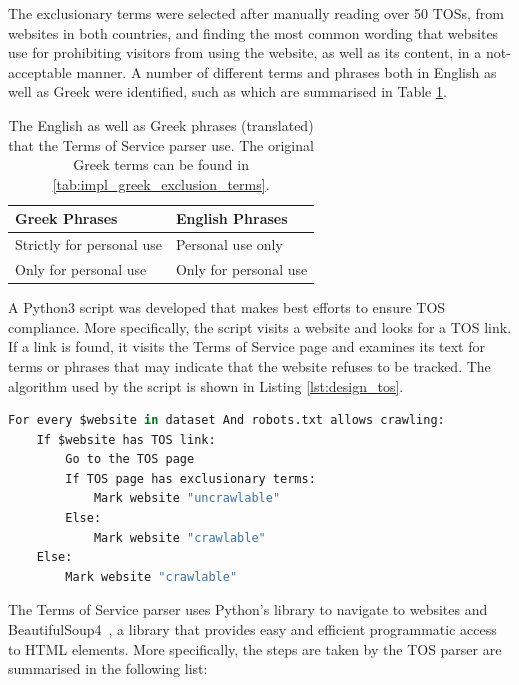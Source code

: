 \documentclass[../main.tex]{subfiles}
\begin{document}
The exclusionary terms were selected after manually reading over 50 TOSs, from websites in both countries, and finding the most common wording that websites use for prohibiting visitors from using the website, as well as its content, in a not-acceptable manner. A number of different terms and phrases both in English as well as Greek were identified, such as  which are summarised in Table \ref{tab:design_tos_terms}.

\begin{table}[ht]
    \centering
    \begin{tabular}{@{}ll@{}}
        \toprule
        \textbf{Greek Phrases}    & \textbf{English Phrases} \\ \midrule
        Strictly for personal use & Personal use only        \\
        Only for personal use     & Only for personal use    \\ \bottomrule
    \end{tabular}
    \caption{The English as well as Greek phrases (translated) that the Terms of Service parser use. The original Greek terms can be found in \ref{tab:impl_greek_exclusion_terms}.}
    \label{tab:design_tos_terms}
\end{table}

\newpage
A Python3 script was developed that makes best efforts to ensure TOS compliance. More specifically, the script visits a website and looks for a TOS link. If a link is found, it visits the Terms of Service page and examines its text for terms or phrases that may indicate that the website refuses to be tracked. The algorithm used by the script is shown in Listing \ref{lst:design_tos}.

\begin{lstlisting}[language=Python, caption=Pseudocode of the algorithm that the Terms of Service parser uses., label=lst:design_tos,captionpos=b, style=lst_style]
For every $website in dataset And robots.txt allows crawling:
    If $website has TOS link:
        Go to the TOS page
        If TOS page has exclusionary terms:
            Mark website "uncrawlable"
        Else:
            Mark website "crawlable"
    Else:
        Mark website "crawlable"
\end{lstlisting}

The Terms of Service parser uses Python’s  library to navigate to websites and BeautifulSoup4~\cite{richardson2007beautiful}, a library that provides easy and efficient programmatic access to HTML elements. More specifically, the steps are taken by the TOS parser are summarised in the following list:
\end{document}
